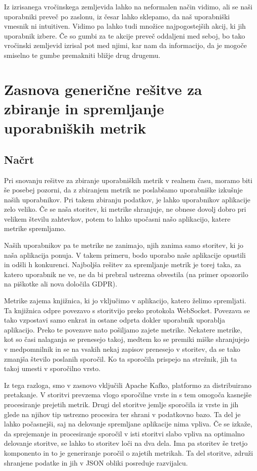 \documentclass[a4paper, 12pt]{book}
\begin{document}
Iz izrisanega vročinskega zemljevida lahko na neformalen način vidimo, ali se naši uporabniki preveč  po zaslonu, iz česar lahko sklepamo, da naš uporabniški vmesnik ni intuitiven. Vidimo pa lahko tudi množice najpogostejših akcij, ki jih uporabnik izbere. Če so gumbi za te akcije preveč oddaljeni med seboj, bo tako vročinski zemljevid izrisal pot med njimi, kar nam da informacijo, da je mogoče smiselno te gumbe premakniti bližje drug drugemu.

\chapter{Zasnova generične rešitve za zbiranje in spremljanje uporabniških metrik}
\label{ch3}

\section{Načrt}
\label{ch3:sec1}

Pri snovanju rešitve za zbiranje uporabniških metrik v realnem času, moramo biti še posebej pozorni, da z zbiranjem metrik ne poslabšamo uporabniške izkušnje naših uporabnikov. Pri takem zbiranju podatkov, je lahko uporabnikov aplikacije zelo veliko. Če se naša storitev, ki metrike shranjuje, ne obnese dovolj dobro pri velikem številu zahtevkov, potem to lahko upočasni našo aplikacijo, katere metrike spremljamo.

Naših uporabnikov pa te metrike ne zanimajo, njih zanima samo storitev, ki jo naša aplikacija ponuja. V takem primeru, bodo uporabo naše aplikacije opustili in odšli h konkurenci. Najboljša rešitev za spremljanje metrik je torej taka, za katero uporabnik ne ve, ne da bi prebral ustrezna obvestila (na primer opozorilo na piškotke ali nova določila GDPR).

Metrike zajema knjižnica, ki jo vključimo v aplikacijo, katero želimo spremljati. Ta knjižnica odpre povezavo s storitvijo preko protokola WebSocket. Povezava se tako vzpostavi samo enkrat in ostane odprta dokler uporabnik uporablja aplikacijo. Preko te povezave nato pošiljamo zajete metrike. Nekatere metrike, kot so časi nalaganja se prenesejo takoj, medtem ko se premiki miške shranjujejo v medpomnilnik in se na vsakih nekaj zapisov prenesejo v storitev, da se tako zmanjša število poslanih sporočil. Ko ta sporočila prispejo na strežnik, jih ta takoj umesti v sporočilno vrsto.

Iz tega razloga, smo v zasnovo vključili Apache Kafko, platformo za distribuirano pretakanje. V storitvi prevzema vlogo sporočilne vrste in s tem omogoča kasnejše procesiranje prejetih metrik. Drugi del storitve jemlje sporočila iz vrste in jih glede na njihov tip ustrezno procesira ter shrani v podatkovno bazo. Ta del je lahko počasnejši, saj na delovanje spremljane aplikacije nima vpliva. Če se izkaže, da sprejemanje in procesiranje sporočil v isti storitvi slabo vpliva na optimalno delovanje storitve, se lahko to storitev loči na dva dela. Ima pa storitev še tretjo komponento in to je generiranje poročil o zajetih metrikah. Ta del storitve, združi shranjene podatke in jih v JSON obliki posreduje razvijalcu.
\end{document}
